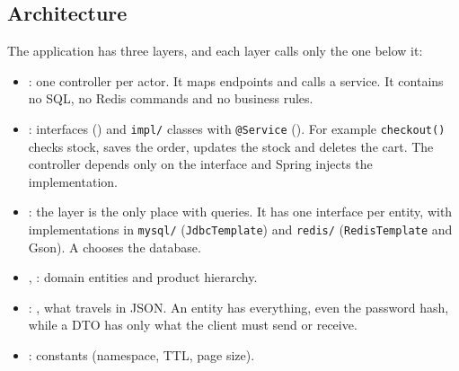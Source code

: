 \subsection{Architecture}
The application has three layers, and each layer calls only the one below it:
\begin{center}
\end{center}

\begin{itemize}
  \item {}: one controller per actor. It maps endpoints and calls a service. It contains no SQL, no Redis commands and no business rules.
  \item {}: interfaces () and \texttt{impl/} classes with \texttt{@Service} (). For example \texttt{checkout()} checks stock, saves the order, updates the stock and deletes the cart. The controller depends only on the interface and Spring injects the implementation.
  \item {}: the  layer is the only place with queries. It has one interface per entity, with implementations in \texttt{mysql/} (\texttt{JdbcTemplate}) and \texttt{redis/} (\texttt{RedisTemplate} and Gson). A  chooses the database.
  \item {}, : domain entities and product hierarchy.
  \item {}: , what travels in JSON. An entity has everything, even the password hash, while a DTO has only what the client must send or receive.
  \item {}: constants (namespace, TTL, page size).
\end{itemize}

